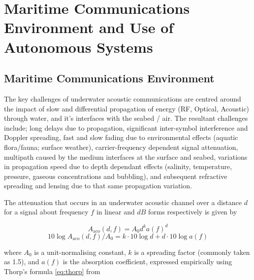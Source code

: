 \def\ChapterTitle{Maritime Communications Environment and Use of Autonomous Systems}

\ifx\ifthesis\undefined

\else
\chapter{\ChapterTitle}
\label{Chapter\thechapter}
\fi


\section{Maritime Communications Environment}\label{sec:trust_in_marine}

The key challenges of underwater acoustic communications are centred around the impact of slow and differential propagation of energy (RF, Optical, Acoustic) through water, and it's interfaces with the seabed / air.
The resultant challenges include; long delays due to propagation, significant inter-symbol interference and Doppler spreading, fast and slow fading due to environmental effects (aquatic flora/fauna; surface weather), carrier-frequency dependent signal attenuation, multipath caused by the medium interfaces at the surface and seabed, variations in propagation speed due to depth dependant effects (salinity, temperature, pressure, gaseous concentrations and bubbling), and subsequent refractive spreading and lensing due to that same propagation variation\cite{Partan2006}.

The attenuation that occurs in an underwater acoustic channel over a distance $d$ for a signal about frequency $f$ in linear and $dB$ forms respectively is given by

\begin{equation}
\label{eq:acoattenuation}
A_{\text{aco}}(d,f) = A_0d^ka(f)^d
\end{equation}
\begin{equation}
\label{eq:acoattenuationdb}
10 \log A_{\text{aco}}(d,f)/A_0 = k \cdot 10 \log d + d \cdot 10 \log a(f)
\end{equation}

where $A_0$ is a unit-normalising constant, $k$ is a spreading factor (commonly taken as 1.5), and $a(f)$ is the absorption coefficient, expressed empirically using Thorp's formula \eqref{eq:thorp} from \cite{Stojanovic2007}

